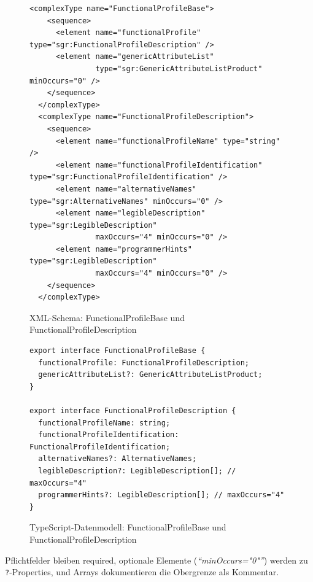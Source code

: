 \documentclass[a4paper,12pt]{article}
\newcommand{\xmlattr}[1]{\textit{``#1''}}
\newcommand{\code}[1]{\texttt{#1}}
\begin{document}
\begin{figure}[H]
    \centering
    \begin{lstlisting}[language=xsdselective,frame=single,backgroundcolor=\color{gray!10},basicstyle=\ttfamily\scriptsize,breaklines=true]
  <complexType name="FunctionalProfileBase">
    <sequence>
      <element name="functionalProfile" type="sgr:FunctionalProfileDescription" />
      <element name="genericAttributeList" 
               type="sgr:GenericAttributeListProduct" minOccurs="0" />
    </sequence>
  </complexType>
  <complexType name="FunctionalProfileDescription">
    <sequence>
      <element name="functionalProfileName" type="string" />
      <element name="functionalProfileIdentification" type="sgr:FunctionalProfileIdentification" />
      <element name="alternativeNames" type="sgr:AlternativeNames" minOccurs="0" />
      <element name="legibleDescription" type="sgr:LegibleDescription" 
               maxOccurs="4" minOccurs="0" />
      <element name="programmerHints" type="sgr:LegibleDescription" 
               maxOccurs="4" minOccurs="0" />
    </sequence>
  </complexType>
    \end{lstlisting}
    \caption{XML-Schema: FunctionalProfileBase und FunctionalProfileDescription}
    \label{fig:xsd-functional-profile}
\end{figure}

\begin{figure}[H]
    \centering
    \begin{lstlisting}[language=typescriptselective,frame=single,backgroundcolor=\color{gray!10},basicstyle=\ttfamily\scriptsize,breaklines=true]
export interface FunctionalProfileBase {
  functionalProfile: FunctionalProfileDescription;
  genericAttributeList?: GenericAttributeListProduct;
}

export interface FunctionalProfileDescription {
  functionalProfileName: string;
  functionalProfileIdentification: FunctionalProfileIdentification;
  alternativeNames?: AlternativeNames;
  legibleDescription?: LegibleDescription[]; // maxOccurs="4"
  programmerHints?: LegibleDescription[]; // maxOccurs="4"
}
    \end{lstlisting}
    \caption{TypeScript-Datenmodell: FunctionalProfileBase und FunctionalProfileDescription}
    \label{fig:ts-functional-profile}
\end{figure}

\noindent Pflichtfelder bleiben required, optionale Elemente (\xmlattr{minOccurs="0"}) werden zu \code{?}-Properties, 
und Arrays dokumentieren die Obergrenze als Kommentar.
\end{document}
